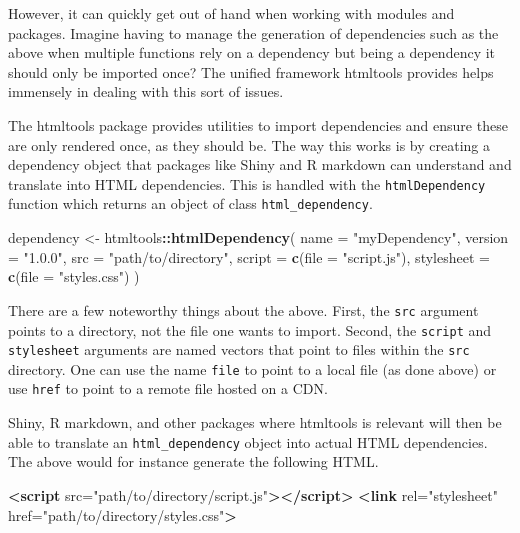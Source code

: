 \documentclass[
]{krantz}
\makeatletter
\newenvironment{Shaded}{\begin{snugshade}}{\end{snugshade}}
\newcommand{\DataTypeTok}[1]{\textcolor[rgb]{0.27,0.27,0.27}{#1}}
\newcommand{\KeywordTok}[1]{\textcolor[rgb]{0.27,0.27,0.27}{\textbf{#1}}}
\newcommand{\NormalTok}[1]{#1}
\newcommand{\OperatorTok}[1]{\textcolor[rgb]{0.43,0.43,0.43}{\textbf{#1}}}
\newcommand{\OtherTok}[1]{\textcolor[rgb]{0.37,0.37,0.37}{#1}}
\newcommand{\StringTok}[1]{\textcolor[rgb]{0.5,0.5,0.5}{#1}}
\newenvironment{kframe}{%
\medskip{}
\setlength{\fboxsep}{.8em}
 \def\at@end@of@kframe{}%
 \ifinner\ifhmode%
  \def\at@end@of@kframe{\end{minipage}}%
  \begin{minipage}{\columnwidth}%
 \fi\fi%
 \def\FrameCommand##1{\hskip\@totalleftmargin \hskip-\fboxsep
 \colorbox{shadecolor}{##1}\hskip-\fboxsep
     \hskip-\linewidth \hskip-\@totalleftmargin \hskip\columnwidth}%
 \MakeFramed {\advance\hsize-\width
   \@totalleftmargin\z@ \linewidth\hsize
   \@setminipage}}%
 {\par\unskip\endMakeFramed%
 \at@end@of@kframe}
\renewenvironment{Shaded}{\begin{kframe}}{\end{kframe}}
\makeatother
\begin{document}
However, it can quickly get out of hand when working with modules and packages. Imagine having to manage the generation of dependencies such as the above when multiple functions rely on a dependency but being a dependency it should only be imported once? The unified framework htmltools provides helps immensely in dealing with this sort of issues.

The htmltools package provides utilities to import dependencies and ensure these are only rendered once, as they should be. The way this works is by creating a dependency object that packages like Shiny and R markdown can understand and translate into HTML dependencies. This is handled with the \texttt{htmlDependency} function which returns an object of class \texttt{html\_dependency}.

\begin{Shaded}
\begin{Highlighting}[]
\NormalTok{dependency \textless{}{-}}\StringTok{ }\NormalTok{htmltools}\OperatorTok{::}\KeywordTok{htmlDependency}\NormalTok{(}
  \DataTypeTok{name =} \StringTok{"myDependency"}\NormalTok{,}
  \DataTypeTok{version =} \StringTok{"1.0.0"}\NormalTok{,}
  \DataTypeTok{src =} \StringTok{"path/to/directory"}\NormalTok{,}
  \DataTypeTok{script =} \KeywordTok{c}\NormalTok{(}\DataTypeTok{file =} \StringTok{"script.js"}\NormalTok{),}
  \DataTypeTok{stylesheet =} \KeywordTok{c}\NormalTok{(}\DataTypeTok{file =} \StringTok{"styles.css"}\NormalTok{)}
\NormalTok{)}
\end{Highlighting}
\end{Shaded}

There are a few noteworthy things about the above. First, the \texttt{src} argument points to a directory, not the file one wants to import. Second, the \texttt{script} and \texttt{stylesheet} arguments are named vectors that point to files within the \texttt{src} directory. One can use the name \texttt{file} to point to a local file (as done above) or use \texttt{href} to point to a remote file hosted on a CDN.

Shiny, R markdown, and other packages where htmltools is relevant will then be able to translate an \texttt{html\_dependency} object into actual HTML dependencies. The above would for instance generate the following HTML.

\begin{Shaded}
\begin{Highlighting}[]
\KeywordTok{\textless{}script}\OtherTok{ src=}\StringTok{"path/to/directory/script.js"}\KeywordTok{\textgreater{}\textless{}/script\textgreater{}}
\KeywordTok{\textless{}link}\OtherTok{ rel=}\StringTok{"stylesheet"}\OtherTok{ href=}\StringTok{"path/to/directory/styles.css"}\KeywordTok{\textgreater{}}
\end{Highlighting}
\end{Shaded}
\end{document}
